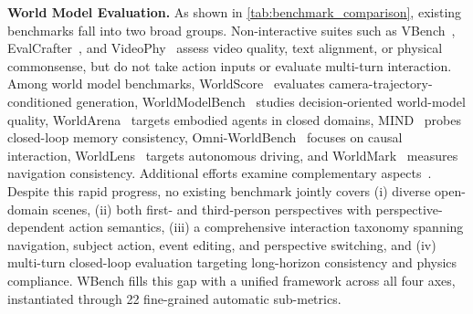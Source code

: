 \documentclass{llmxive}
\providecommand{\numsubmetric}{{22}\xspace}
\providecommand{\benchmark}{WBench }
\begin{document}
\textbf{World Model Evaluation.}
As shown in \cref{tab:benchmark_comparison}, existing benchmarks fall into two broad groups.
Non-interactive suites such as VBench~\cite{huang2024vbench,huang2024vbenchplus,zheng2025vbench2}, EvalCrafter~\cite{liu2024evalcrafter}, and VideoPhy~\cite{bansal2024videophy,meng2024phygenbench} assess video quality, text alignment, or physical commonsense, but do not take action inputs or evaluate multi-turn interaction.
Among world model benchmarks, WorldScore~\cite{duan2024worldscore} evaluates camera-trajectory-conditioned generation, WorldModelBench~\cite{wang2024worldmodelbench} studies decision-oriented world-model quality, WorldArena~\cite{shang2026worldarena} targets embodied agents in closed domains, MIND~\cite{ye2026mind} probes closed-loop memory consistency, Omni-WorldBench~\cite{wu2026omniworldbench} focuses on causal interaction, WorldLens~\cite{worldlens2025} targets autonomous driving, and WorldMark~\cite{xu2026worldmark} measures navigation consistency.
Additional efforts examine complementary aspects~\cite{han2025videobench,liu2024fetv,gu2025phyworldbench,cai2025mmgr,upadhyay2026worldbench,lu2025_4dworldbench,gao2026wrena,lian2024worldsimbench,yue2025ewmbench,zhang2025worldinworld,tang2025interbench,zhou2026drivinggen}.
Despite this rapid progress, no existing benchmark jointly covers (i) diverse open-domain scenes, (ii) both first- and third-person perspectives with perspective-dependent action semantics, (iii) a comprehensive interaction taxonomy spanning navigation, subject action, event editing, and perspective switching, and (iv) multi-turn closed-loop evaluation targeting long-horizon consistency and physics compliance.
\benchmark fills this gap with a unified framework across all four axes, instantiated through \numsubmetric fine-grained automatic sub-metrics.
\end{document}
